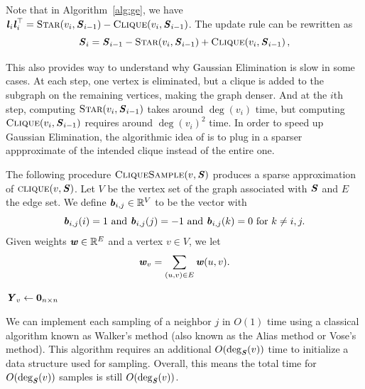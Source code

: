 Note that in Algorithm~\ref{alg:ge}, we have  $\boldsymbol{\mathit{l}}_i\boldsymbol{\mathit{l}}_i^\top = \textsc{Star}\!\left({v_i,\boldsymbol{\mathit{S}}_{i-1}}\right)-\textsc{Clique}\!\left({v_i,\boldsymbol{\mathit{S}}_{i-1}}\right)$. The update rule can be rewritten as
\[ \boldsymbol{\mathit{S}}_{i} = \boldsymbol{\mathit{S}}_{i-1} - \textsc{Star}\!\left({v_i,\boldsymbol{\mathit{S}}_{i-1}}\right) +
  \textsc{Clique}\!\left({v_i,\boldsymbol{\mathit{S}}_{i-1}}\right), \]

This also provides way to understand why
Gaussian Elimination is slow in some cases.
At each step, one vertex is eliminated, but a clique is added to the
subgraph on the remaining vertices, making the graph denser.
And at the $i$th step, computing $\textsc{Star}\!\left({v_i,\boldsymbol{\mathit{S}}_{i-1}}\right)$
takes around $\deg(v_i)$ time, but computing $\textsc{Clique}\!\left({v_i,\boldsymbol{\mathit{S}}_{i-1}}\right)$
requires around $\deg(v_i)^2$ time.
In order to speed up Gaussian
Elimination, the algorithmic idea of \cite{ks16}
 is to plug in a sparser appproximate of the intended clique instead
 of the entire one.

The following procedure $\vcliqsp{v}{\SS}$ produces a sparse
approximation of $\textsc{clique}(v,\boldsymbol{\mathit{S}})$.
Let $V$ be the vertex set of the graph associated with $\boldsymbol{\mathit{S}}$ and $E$
the edge set.
We define $\boldsymbol{\mathit{b}}_{i,j} \in \mathbb{R}^V$ to be the vector with
\[
  \boldsymbol{\mathit{b}}_{i,j}(i) = 1
  \text{ and }
  \boldsymbol{\mathit{b}}_{i,j}(j) = -1
  \text{ and }
  \boldsymbol{\mathit{b}}_{i,j}(k) = 0
  \text{ for }
  k \neq i,j.
\]
Given weights $\boldsymbol{\mathit{w}} \in \mathbb{R}^E$ and a vertex $v \in V$,
we let
\[
  \boldsymbol{\mathit{w}}_v = \sum_{(u,v) \in E} \boldsymbol{\mathit{w}}(u,v)
  .
  \]
\begin{algorithm}[H]
\label{alg:cliquesamp}
\caption{$\vcliqsp{v}{\SS}$}
 $\boldsymbol{\mathit{Y}}_v   \gets  \boldsymbol{0}_{n \times n} $\;
\;
\end{algorithm}
%
\begin{remark}
  We can implement each sampling of a neighbor $j$ in $O(1)$ time
  using a classical algorithm known as Walker's method (also known as the Alias
  method or Vose's method).
  This algorithm requires an additional $O(\deg_{\boldsymbol{\mathit{S}}}(v))$ time to
  initialize a data structure used for sampling.
  Overall, this means the total time for $O(\deg_{\boldsymbol{\mathit{S}}}(v))$ samples is still $O(\deg_{\boldsymbol{\mathit{S}}}(v))$.
\end{remark}

